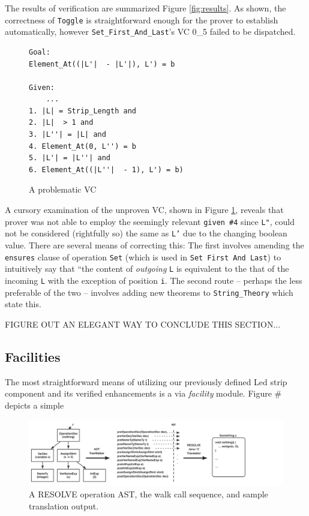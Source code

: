 \documentclass{sig-alternate}
\begin{document}
The results of verification are summarized Figure \ref{fig:results}. As shown, the correctness of \texttt{Toggle} is straightforward enough for the prover to establish automatically, however \texttt{Set\_First\_And\_Last}'s VC 0\_5 failed to be dispatched.

\begin{figure}[!htb]
\begin{verbatim}
Goal:
Element_At((|L'|  - |L'|), L') = b

Given:
    ...
1. |L| = Strip_Length and
2. |L|  > 1 and
3. |L''| = |L| and
4. Element_At(0, L'') = b
5. |L'| = |L''| and
6. Element_At((|L''|  - 1), L') = b)
\end{verbatim}
\caption{A problematic VC}
\label{fig:problematicVC}
\end{figure}

A cursory examination of the unproven VC, shown in Figure \ref{fig:problematicVC}, reveals that prover was not able to employ the seemingly relevant \texttt{given \#4} since \texttt{L"}, could not be considered (rightfully so) the same as \texttt{L'} due to the changing boolean value. There are several means of correcting this: The first involves amending the \texttt{ensures} clause of operation \texttt{Set} (which is used in \texttt{Set First And Last}) to intuitively say that ``the content of \textit{outgoing} \texttt{L} is equivalent to the that of the incoming \texttt{L} with the exception of position \texttt{i}. The second route -- perhaps the less preferable of the two -- involves adding new theorems to \texttt{String\_Theory} which state this. 

FIGURE OUT AN ELEGANT WAY TO CONCLUDE THIS SECTION...

\subsection{Facilities}
\label{sec:facilities}
The most straightforward means of utilizing our previously defined Led strip component and its verified enhancements is a via \textit{facility} module. Figure \# depicts a simple 



\begin{figure}
\centering
\includegraphics[scale=.55]{figs/ast_traversal.pdf}
\caption{A RESOLVE operation AST, the walk call sequence, and sample translation output.}
\end{figure}
\label{fig:ast}
\end{document}
